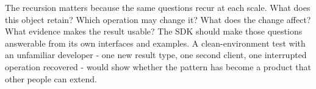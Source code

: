 The recursion matters because the same questions recur at each scale. What does this object retain? Which operation may change it? What does the change affect? What evidence makes the result usable? The SDK should make those questions answerable from its own interfaces and examples. A clean-environment test with an unfamiliar developer - one new result type, one second client, one interrupted operation recovered - would show whether the pattern has become a product that other people can extend.
